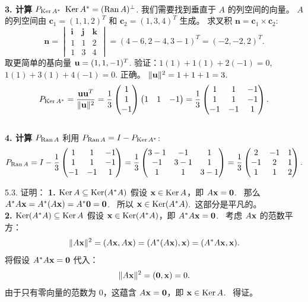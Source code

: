 \begin{exer}
\\
\textbf{3. 计算 $P_{\operatorname{Ker} A^*}$}
$\operatorname{Ker} A^* = (\operatorname{Ran} A)^\perp$. 我们需要找到垂直于 $A$ 的列空间的向量。
$A$ 的列空间由 $\mathbf{c}_1 = (1, 1, 2)^T$ 和 $\mathbf{c}_2 = (1, 3, 4)^T$ 生成。
求叉积 $\mathbf{n} = \mathbf{c}_1 \times \mathbf{c}_2$:
$$ \mathbf{n} = \begin{vmatrix} \mathbf{i} & \mathbf{j} & \mathbf{k} \\ 1 & 1 & 2 \\ 1 & 3 & 4 \end{vmatrix} = (4-6, 2-4, 3-1)^T = (-2, -2, 2)^T. $$
取更简单的基向量 $\mathbf{u} = (1, 1, -1)^T$.
验证：$1(1)+1(1)+2(-1)=0$, $1(1)+3(1)+4(-1)=0$. 正确。
$\|\mathbf{u}\|^2 = 1+1+1=3$.
$$ P_{\operatorname{Ker} A^*} = \frac{\mathbf{u}\mathbf{u}^T}{\|\mathbf{u}\|^2} = \frac{1}{3} \begin{pmatrix} 1 \\ 1 \\ -1 \end{pmatrix} \begin{pmatrix} 1 & 1 & -1 \end{pmatrix} = \frac{1}{3} \begin{pmatrix} 1 & 1 & -1 \\ 1 & 1 & -1 \\ -1 & -1 & 1 \end{pmatrix}. $$
\\
\textbf{4. 计算 $P_{\operatorname{Ran} A}$}
利用 $P_{\operatorname{Ran} A} = I - P_{\operatorname{Ker} A^*}$:
$$ P_{\operatorname{Ran} A} = I - \frac{1}{3} \begin{pmatrix} 1 & 1 & -1 \\ 1 & 1 & -1 \\ -1 & -1 & 1 \end{pmatrix} = \frac{1}{3} \begin{pmatrix} 3-1 & -1 & 1 \\ -1 & 3-1 & 1 \\ 1 & 1 & 3-1 \end{pmatrix} = \frac{1}{3} \begin{pmatrix} 2 & -1 & 1 \\ -1 & 2 & 1 \\ 1 & 1 & 2 \end{pmatrix}. $$

5.3.
证明：
\textbf{1. $\operatorname{Ker} A \subseteq \operatorname{Ker}(A^*A)$}
假设 $\mathbf{x} \in \operatorname{Ker} A$，即 $A\mathbf{x} = \mathbf{0}$.~
那么 $A^*A\mathbf{x} = A^*(A\mathbf{x}) = A^*\mathbf{0} = \mathbf{0}$.~
所以 $\mathbf{x} \in \operatorname{Ker}(A^*A)$.~这部分是平凡的。
\\
\textbf{2. $\operatorname{Ker}(A^*A) \subseteq \operatorname{Ker} A$}
假设 $\mathbf{x} \in \operatorname{Ker}(A^*A)$，即 $A^*A\mathbf{x} = \mathbf{0}$.~
考虑 $A\mathbf{x}$ 的范数平方：
$$ \|A\mathbf{x}\|^2 = (A\mathbf{x}, A\mathbf{x}) = (A^*(A\mathbf{x}), \mathbf{x}) = (A^*A\mathbf{x}, \mathbf{x}). $$
将假设 $A^*A\mathbf{x} = \mathbf{0}$ 代入：
$$ \|A\mathbf{x}\|^2 = (\mathbf{0}, \mathbf{x}) = 0. $$
由于只有零向量的范数为 0，这蕴含 $A\mathbf{x} = \mathbf{0}$，即 $\mathbf{x} \in \operatorname{Ker} A$.~
得证。


\end{exer}
